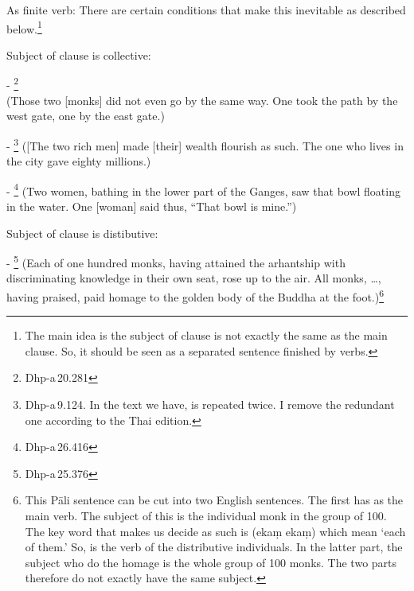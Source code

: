 \begin{compactenum}[(1)]
\item As finite verb: There are certain conditions that make this inevitable as described below.\footnote{The main idea is the subject of  clause is not exactly the same as the main clause. So, it should be seen as a separated sentence finished by  verbs.}\par
\begin{compactenum}[(a)]
\item Subject of  clause is collective:\par
- \footnote{Dhp-a\,20.281} \\(Those two [monks] did not even go by the same way. One took the path by the west gate, one by the east gate.)\par
- \footnote{Dhp-a\,9.124. In the text we have,  is repeated twice. I remove the redundant one according to the Thai edition.} ([The two rich men] made [their] wealth flourish as such. The one who lives in the city gave eighty millions.)\par
- \footnote{Dhp-a\,26.416} (Two women, bathing in the lower part of the Ganges, saw that bowl floating in the water. One [woman] said thus, ``That bowl is mine.'')\par
\item Subject of  clause is distibutive:\par
- \footnote{Dhp-a\,25.376} (Each of one hundred monks, having attained the arhantship with discriminating knowledge in their own seat, rose up to the air. All monks, \ldots, having praised, paid homage to the golden body of the Buddha at the foot.)\footnote{This P\=ali sentence can be cut into two English sentences. The first has  as the main verb. The subject of this is the individual monk in the group of 100. The key word that makes us decide as such is  (eka\d m eka\d m) which mean `each of them.' So,  is the verb of the distributive individuals. In the latter part, the subject who do the homage is the whole group of 100 monks. The two parts therefore do not exactly have the same subject.}\par

\end{compactenum}
\end{compactenum}
